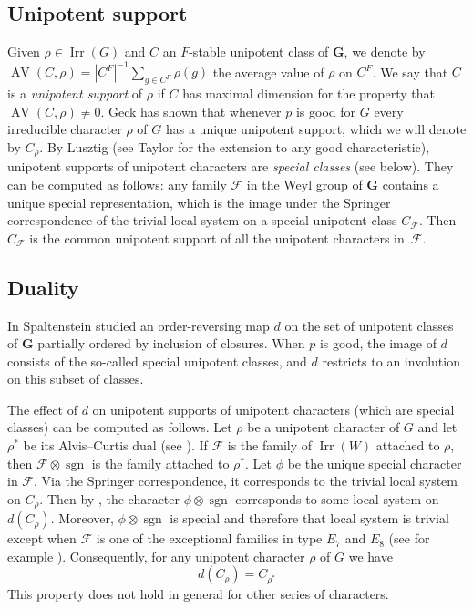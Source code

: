 \documentclass[12pt,leqno,a4paper]{amsart}
\newcommand{\bG}{{\mathbf{G}}}
\newcommand{\cF}{{\mathcal{F}}}
\newcommand{\AV}{{\operatorname{AV}}}
\newcommand{\Irr}{{\operatorname{Irr}}}
\newcommand{\sgn}{{\operatorname{sgn}}}
\theoremstyle{remark}
\begin{document}
\subsection{Unipotent support}   \label{subsec:support}
Given $\rho\in \Irr(G)$ and $C$ an $F$-stable unipotent class of $\bG$, we
denote by $\AV(C,\rho) = |C^F|^{-1}\sum_{g \in C^F}\rho(g)$ the average value
of $\rho$ on $C^F$. We say that $C$ is a \emph{unipotent support} of $\rho$
if $C$ has maximal dimension for the property that $\AV(C,\rho)\neq 0$.
Geck \cite[Thm.~1.4]{Ge96} has shown that whenever $p$ is good for $G$ every
irreducible character $\rho$ of $G$ has a unique unipotent support, which we
will denote by $C_\rho$. By Lusztig \cite[\S11]{Lu92} (see Taylor
\cite[\S14]{Tay14} for the extension to any good
characteristic), unipotent supports of unipotent characters are \emph{special
classes} (see below). They can be computed as follows: any family $\cF$ in
the Weyl group of $\bG$ contains a unique special representation, which is
the image under the Springer correspondence of the trivial local system on a
special unipotent class $C_\cF$. Then $C_\cF$ is the common unipotent
support of all the unipotent characters in~$\cF$.

\subsection{Duality}
In \cite[III.1]{SpB} Spaltenstein studied an order-reversing map $d$ on the set
of unipotent classes of $\bG$ partially ordered by inclusion of closures.
When $p$ is good, the image of $d$ consists of the so-called special unipotent
classes, and $d$ restricts to an involution on this subset of classes.
\smallskip

The effect of $d$ on unipotent supports of unipotent characters (which
are special classes) can be computed as follows. Let $\rho$ be a unipotent
character of $G$ and let $\rho^*$ be its Alvis--Curtis dual (see
\cite[\S8]{DM91}). If $\cF$ is the family of $\Irr(W)$ attached to
$\rho$, then $\cF \otimes \sgn$ is the family attached to $\rho^*$.
Let $\phi$ be the unique special character in $\cF$. Via the Springer
correspondence, it corresponds to the trivial local system on $C_\rho$.
Then by \cite[\S3]{BV85}, the character $\phi \otimes \sgn$ corresponds
to some local system on $d(C_\rho)$. Moreover, $\phi \otimes \sgn$ is special
and therefore that local system is trivial except when $\cF$ is one
of the exceptional families in type $E_7$ and $E_8$ (see for example
\cite[\S11.3 and \S12.7]{Ca}). Consequently, for any unipotent character
$\rho$ of $G$ we have
\begin{equation}   \label{eq:(1)}
  d(C_\rho) = C_{\rho^*}
\end{equation}
This property does not hold in general for other series of characters.
\end{document}
